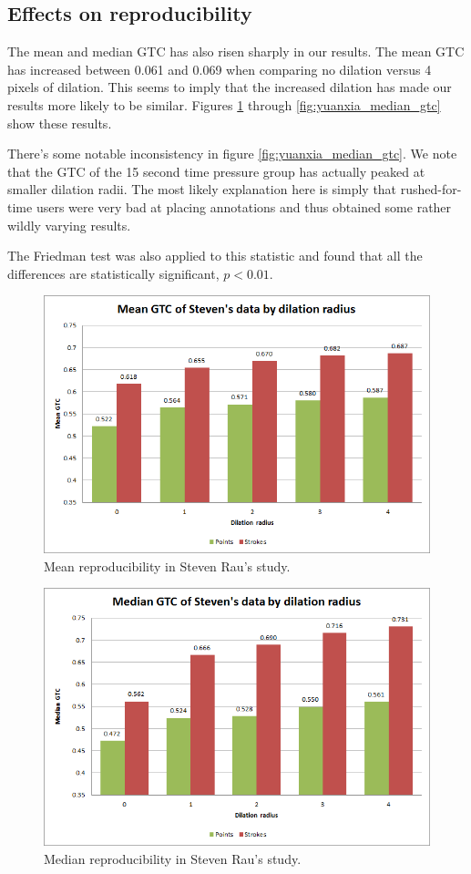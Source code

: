 \documentclass[12pt,a4paper,notitlepage]{article}
\begin{document}
\subsection{Effects on reproducibility}
The mean and median GTC has also risen sharply in our results. The mean GTC has increased between 0.061 and 0.069 when comparing no dilation versus 4 pixels of dilation. This seems to imply that the increased dilation has made our results more likely to be similar. Figures \ref{fig:steven_mean_gtc} through \ref{fig:yuanxia_median_gtc} show these results.

There's some notable inconsistency in figure \ref{fig:yuanxia_median_gtc}. We note that the GTC of the 15 second time pressure group has actually peaked at smaller dilation radii. The most likely explanation here is simply that rushed-for-time users were very bad at placing annotations and thus obtained some rather wildly varying results.

The Friedman test was also applied to this statistic and found that all the differences are statistically significant, $p < 0.01$.

\begin{figure}[H]
	\includegraphics[width=.9\linewidth]{steven_mean_gtc}
	\caption{Mean reproducibility in Steven Rau's study.}
	\label{fig:steven_mean_gtc}
\end{figure}

\begin{figure}[H]
	\includegraphics[width=.9\linewidth]{steven_median_gtc}
	\caption{Median reproducibility in Steven Rau's study.}
	\label{fig:steven_median_gtc}
\end{figure}
\end{document}
